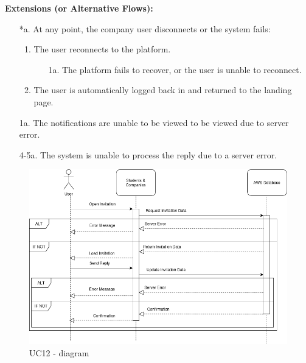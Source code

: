 \begin{itemize}[label={[\textbf{UC}]}, align=left, leftmargin=*]
    \textbf{Extensions (or Alternative Flows):} 
    \begin{enumerate}[label=\arabic*.]
        \item[*a.] At any point, the company user disconnects or the system fails:
            \begin{enumerate}[label=\arabic*.]
                \item The user reconnects to the platform.
                    \begin{enumerate}[label=\alph*.]
                        \item[1a.] The platform fails to recover, or the user is unable to reconnect.
                    \end{enumerate}
                 \item The user is automatically logged back in and returned to the landing page.
            \end{enumerate}
        \item[1a.] The notifications are unable to be viewed to be viewed due to server error.
        \item[4-5a.] The system is unable to process the reply due to a server error. 
        \end{enumerate}

    
     \begin{figure}[H]
    	\includegraphics[width=\textwidth,height=\textheight,keepaspectratio]{RASD-Latex/assets/Use Case Diagrams/UC12.png}
    	\caption{UC12 - diagram}
    	\label{fig:DataRequest}
    \end{figure}
    

\end{itemize}
